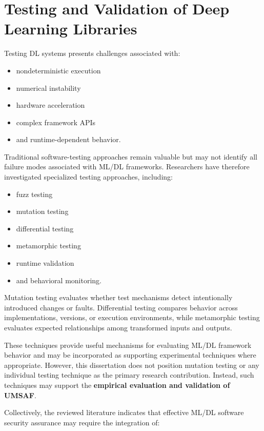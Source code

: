 \documentclass[
  12pt,
  letterpaper,
  oneside]{report}
\providecommand{\tightlist}{%
  \setlength{\itemsep}{0pt}\setlength{\parskip}{0pt}}
\begin{document}
\section{Testing and Validation of Deep Learning Libraries}\label{816-testing-and-validation-of-deep-learning-libraries}

Testing DL systems presents challenges associated with:

\begin{itemize}
\tightlist
\item
  nondeterministic execution
\item
  numerical instability
\item
  hardware acceleration
\item
  complex framework APIs
\item
  and runtime-dependent behavior.
\end{itemize}

Traditional software-testing approaches remain valuable but may not
identify all failure modes associated with ML/DL frameworks. Researchers
have therefore investigated specialized testing approaches, including:

\begin{itemize}
\tightlist
\item
  fuzz testing
\item
  mutation testing
\item
  differential testing
\item
  metamorphic testing
\item
  runtime validation
\item
  and behavioral monitoring.
\end{itemize}

Mutation testing evaluates whether test mechanisms detect intentionally
introduced changes or faults. Differential testing compares behavior
across implementations, versions, or execution environments, while
metamorphic testing evaluates expected relationships among transformed
inputs and outputs.

These techniques provide useful mechanisms for evaluating ML/DL
framework behavior and may be incorporated as supporting experimental
techniques where appropriate. However, this dissertation does not
position mutation testing or any individual testing technique as the
primary research contribution. Instead, such techniques may support the
\textbf{empirical evaluation and validation of UMSAF}.

Collectively, the reviewed literature indicates that effective ML/DL
software security assurance may require the integration of:
\end{document}
